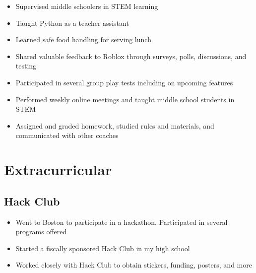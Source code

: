 \documentclass{my_cv}
\begin{document}
\begin{itemize}
    \item Supervised middle schoolers in STEM learning
    \item Taught Python as a teacher assistant
    \item Learned safe food handling for serving lunch
\end{itemize}

\begin{itemize}
    \item Shared valuable feedback to Roblox through surveys, polls, discussions, and testing
    \item Participated in several group play tests including on upcoming features
\end{itemize}

\begin{itemize}
    \item Performed weekly online meetings and taught middle school students in STEM
    \item Assigned and graded homework, studied rules and materials, and communicated with other coaches
\end{itemize}

\section{Extracurricular}

\subsection{Hack Club}
\begin{itemize}
    \item Went to Boston to participate in a hackathon. Participated in several programs offered
    \item Started a fiscally sponsored Hack Club in my high school
    \item Worked closely with Hack Club to obtain stickers, funding, posters, and more
\end{itemize}

\end{document}

